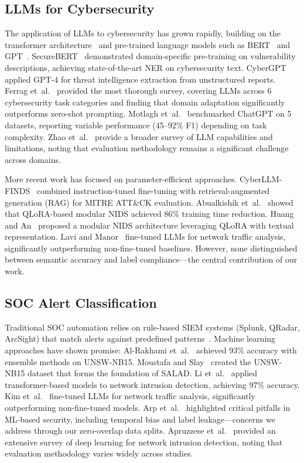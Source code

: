 \documentclass[journal]{IEEEtran}
\begin{document}
\subsection{LLMs for Cybersecurity}
The application of LLMs to cybersecurity has grown rapidly, building on the transformer architecture~\cite{vaswani2017} and pre-trained language models such as BERT~\cite{devlin2019} and GPT~\cite{radford2019}. SecureBERT~\cite{aghaei2023} demonstrated domain-specific pre-training on vulnerability descriptions, achieving state-of-the-art NER on cybersecurity text. CyberGPT~\cite{alshaer2024} applied GPT-4 for threat intelligence extraction from unstructured reports. Ferrag et~al.~\cite{ferrag2024} provided the most thorough survey, covering LLMs across 6 cybersecurity task categories and finding that domain adaptation significantly outperforms zero-shot prompting. Motlagh et~al.~\cite{motlagh2024} benchmarked ChatGPT on 5 datasets, reporting variable performance (45--92\% F1) depending on task complexity. Zhao et~al.~\cite{zhao2023} provide a broader survey of LLM capabilities and limitations, noting that evaluation methodology remains a significant challenge across domains.

More recent work has focused on parameter-efficient approaches. CyberLLM-FINDS~\cite{cyberllm2025} combined instruction-tuned fine-tuning with retrieval-augmented generation (RAG) for MITRE ATT\&CK evaluation. Abualkishik et~al.~\cite{abualkishik2025} showed that QLoRA-based modular NIDS achieved 86\% training time reduction. Huang and An~\cite{huang2025} proposed a modular NIDS architecture leveraging QLoRA with textual representation. Lavi and Manor~\cite{lavi2024} fine-tuned LLMs for network traffic analysis, significantly outperforming non-fine-tuned baselines. However, none distinguished between semantic accuracy and label compliance---the central contribution of our work.

\subsection{SOC Alert Classification}
Traditional SOC automation relies on rule-based SIEM systems (Splunk, QRadar, ArcSight) that match alerts against predefined patterns~\cite{ponemon2023}. Machine learning approaches have shown promise: Al-Rakhami et~al.~\cite{alrakhami2022} achieved 93\% accuracy with ensemble methods on UNSW-NB15. Moustafa and Slay~\cite{moustafa2016} created the UNSW-NB15 dataset that forms the foundation of SALAD. Li et~al.~\cite{li2024} applied transformer-based models to network intrusion detection, achieving 97\% accuracy. Kim et~al.~\cite{kim2024} fine-tuned LLMs for network traffic analysis, significantly outperforming non-fine-tuned models. Arp et~al.~\cite{arp2022} highlighted critical pitfalls in ML-based security, including temporal bias and label leakage---concerns we address through our zero-overlap data splits. Apruzzese et~al.~\cite{apruzzese2023} provided an extensive survey of deep learning for network intrusion detection, noting that evaluation methodology varies widely across studies.
\end{document}
